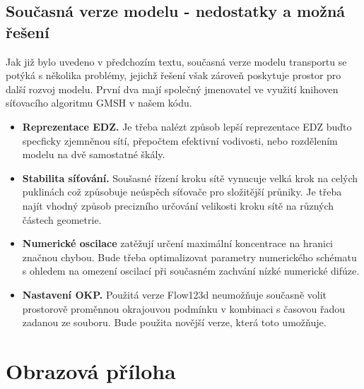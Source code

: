 \documentclass[11pt,a4paper]{article}
\begin{document}
\begin{onehalfspacing}
\subsection{Současná verze modelu - nedostatky a možná řešení}
\label{detskenemoci}
Jak již bylo uvedeno v předchozím textu, současná verze modelu transportu se potýká s několika problémy, jejichž řešení však zároveň poskytuje prostor pro další rozvoj modelu. První dva mají společný jmenovatel ve využití knihoven síťovacího algoritmu GMSH \cite{Geuzaine2009b} v našem kódu.
\begin{itemize}
 \item {\bf Reprezentace EDZ.} Je třeba nalézt způsob lepší reprezentace EDZ buďto specficky zjemněnou sítí, přepočtem efektivní vodivosti, nebo rozdělením modelu na dvě samostatné škály.
 \item {\bf Stabilita síťování.} Soušasné řízení kroku sítě vynucuje velká krok na celých puklinách což způsobuje neúspěch síťovače
 pro složitější průniky. Je třeba najít vhodný způsob precizního určování velikosti kroku sítě na různých částech geometrie.
 \item {\bf Numerické oscilace} zatěžují určení maximální koncentrace na hranici značnou chybou. Bude třeba optimalizovat parametry numerického schématu s ohledem na omezení oscilací při současném zachvání nízké numerické difúze.
 \item {\bf Nastavení OKP.} Použitá verze Flow123d neumožňuje současně volit prostorově proměnnou okrajouvou podmínku v kombinaci s časovou řadou zadanou ze souboru. Bude použita novější verze, která toto umožňuje.
\end{itemize}





%


\section{Obrazová příloha}

\end{onehalfspacing}
\end{document}
